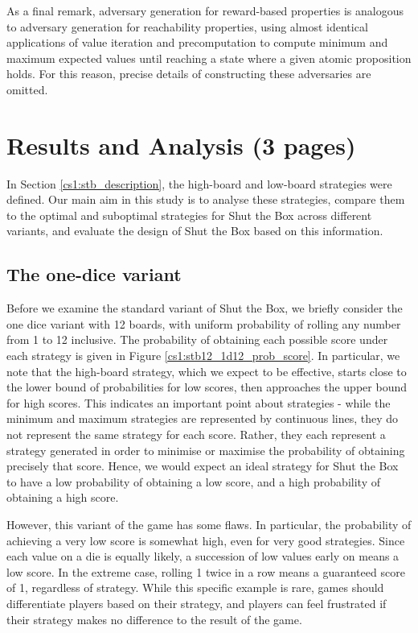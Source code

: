 As a final remark, adversary generation for reward-based properties is analogous to adversary generation for reachability properties, using almost identical applications of value iteration and precomputation to compute minimum and maximum expected values until reaching a state where a given atomic proposition holds. For this reason, precise details of constructing these adversaries are omitted.

\section{Results and Analysis (3 pages)}
\label{cs1:stb_results}

In Section \ref{cs1:stb_description}, the high-board and low-board strategies were defined. Our main aim in this study is to analyse these strategies, compare them to the optimal and suboptimal strategies for Shut the Box across different variants, and evaluate the design of Shut the Box based on this information.

\subsection{The one-dice variant}
\label{cs1:stb_one_dice}

Before we examine the standard variant of Shut the Box, we briefly consider the one dice variant with 12 boards, with uniform probability of rolling any number from 1 to 12 inclusive. The probability of obtaining each possible score under each strategy is given in Figure \ref{cs1:stb12_1d12_prob_score}. In particular, we note that the high-board strategy, which we expect to be effective, starts close to the lower bound of probabilities for low scores, then approaches the upper bound for high scores. This indicates an important point about strategies - while the minimum and maximum strategies are represented by continuous lines, they do not represent the same strategy for each score. Rather, they each represent a strategy generated in order to minimise or maximise the probability of obtaining precisely that score. Hence, we would expect an ideal strategy for Shut the Box to have a low probability of obtaining a low score, and a high probability of obtaining a high score.


However, this variant of the game has some flaws. In particular, the probability of achieving a very low score is somewhat high, even for very good strategies. Since each value on a die is equally likely, a succession of low values early on means a low score. In the extreme case, rolling 1 twice in a row means a guaranteed score of 1, regardless of strategy. While this specific example is rare, games should differentiate players based on their strategy, and players can feel frustrated if their strategy makes no difference to the result of the game.

